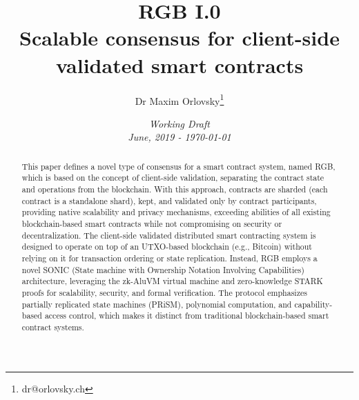 \documentclass[a4paper]{article}
\title{RGB I.0\\Scalable consensus for client-side validated smart contracts}
\author[1,2,3]{Dr Maxim Orlovsky\thanks{dr@orlovsky.ch}}
\affil[1]{LNP/BP Labs \& UBIDECO Labs\\Institute for Distributed and Cognitive Systems\\Lugano\\Switzerland}
\affil[2]{Pandora Prime SA\\Neuchatel\\Switzerland}
\date{\it Working Draft\\ June, 2019 - \today}
\begin{document}
\pagecolor{yellow!10}
\maketitle

\begin{abstract}
This paper defines a novel type of consensus for a smart contract system, named RGB,
which is based on the concept of client-side validation,
separating the contract state and operations from the blockchain.
With this approach, contracts are sharded (each contract is a standalone shard),
kept, and validated only by contract participants,
providing native scalability and privacy mechanisms,
exceeding abilities of all existing blockchain-based smart contracts
while not compromising on security or decentralization.
The client-side validated distributed smart contracting system is
designed to operate on top of an UTXO-based blockchain (e.g., Bitcoin)
without relying on it for transaction ordering or state replication.
Instead, RGB employs a novel SONIC (State machine with Ownership Notation Involving Capabilities) architecture,
leveraging the zk-AluVM virtual machine and zero-knowledge STARK proofs
for scalability, security, and formal verification.
The protocol emphasizes partially replicated state machines (PRiSM),
polynomial computation, and capability-based access control,
which makes it distinct from traditional blockchain-based smart contract systems.
\end{abstract}
\end{document}
